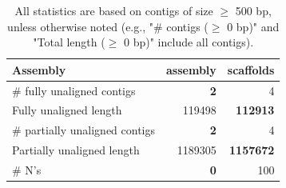 \documentclass[12pt,a4paper]{article}
\begin{document}
\begin{table}[ht]
\begin{center}
\caption{All statistics are based on contigs of size $\geq$ 500 bp, unless otherwise noted (e.g., "\# contigs ($\geq$ 0 bp)" and "Total length ($\geq$ 0 bp)" include all contigs).}
\begin{tabular}{|l*{2}{|r}|}
\hline
Assembly & assembly & scaffolds \\ \hline
\# fully unaligned contigs & {\bf 2} & 4 \\ \hline
Fully unaligned length & 119498 & {\bf 112913} \\ \hline
\# partially unaligned contigs & {\bf 2} & 4 \\ \hline
Partially unaligned length & 1189305 & {\bf 1157672} \\ \hline
\# N's & {\bf 0} & 100 \\ \hline
\end{tabular}
\end{center}
\end{table}
\end{document}
